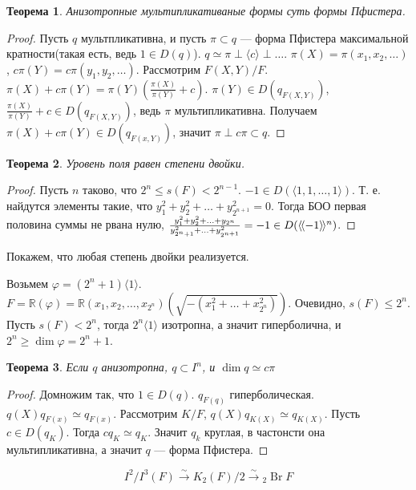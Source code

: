 \documentclass{article}
\newtheorem*{theorem}{Теорема}
\theoremstyle{definition}
\theoremstyle{remark}
\DeclareMathOperator{\Br}{Br}
\newcommand{\llangle}{\langle \hspace{-.5mm} \langle}
\newcommand{\rrangle}{\rangle \hspace{-.5mm} \rangle}
\newcommand{\R}{\mathbb{R}}
\begin{document}
\begin{theorem}
    Анизотропные мультипликативаные формы суть формы Пфистера.
\end{theorem}
\begin{proof}
    Пусть $q$ мультпликативна, и пусть $\pi \subset q$ --- форма Пфистера максимальной кратности(такая есть, ведь $1 \in D(q)$). $q \simeq \pi \perp \langle c \rangle \perp \ldots$. $\pi(X) = \pi(x_1, x_2, \ldots)$, $c\pi(Y) = c\pi(y_1, y_2, \ldots)$. Рассмотрим $F(X, Y) / F$. $\pi(X) + c\pi(Y) = \pi(Y)(\frac{\pi(X)}{\pi(Y)} + c)$. $\pi(Y) \in D(q_{F(X, Y)})$, $\frac{\pi(X)}{\pi(Y)} + c \in D(q_{F(X, Y)})$, ведь $\pi$ мультипликативна. Получаем $\pi(X) + c \pi(Y) \in D(q_{F(x, Y)})$, значит $\pi \perp c\pi \subset q$.
\end{proof}

\begin{theorem}
    Уровень поля равен степени двойки.
\end{theorem}
\begin{proof}
    Пусть $n$ таково, что $2^n \leq s(F) < 2^{n - 1}$. $-1 \in D(\langle 1, 1, \ldots, 1 \rangle)$. Т. е. найдутся элементы такие, что $y_1^2 + y_2^2 + \ldots + y_{2^{n + 1}}^2 = 0$. Тогда БОО первая половина суммы не рвана нулю, $\frac{y_1^2 + y_2^2 + \ldots + y_{2^n}}{y_{2^n + 1}^2 + \ldots + y_{2^{n + 1}}^2} = -1 \in D(\llangle -1 \rrangle^n)$.
\end{proof}

Покажем, что любая степень двойки реализуется.

Возьмем $\varphi = (2^n + 1)\langle 1 \rangle$. $F = \R(\varphi) = \R(x_1, x_2, \ldots, x_{2^n})(\sqrt{-(x_1^2 + \ldots + x_{2^n}^2)})$. Очевидно, $s(F) \leq 2^n$. Пусть $s(F) < 2^n$, тогда $2^n\langle 1 \rangle$ изотропна, а значит гиперболична, и $2^n \geq \dim \varphi = 2^n + 1$.

\begin{theorem}
    Если $q$ анизотропна, $q \subset I^n$, и $\dim q \simeq c\pi$
\end{theorem}
\begin{proof}
    Домножим так, что $1 \in D(q)$. $q_{F(q)}$ гиперболическая. $q(X) q_{F(x)} \simeq q_{F(x)}$. Рассмотрим $K / F$, $q(X)q_{K(X)} \simeq q_{K(X)}$. Пусть $c \in D(q_{K})$. Тогда $cq_K \simeq q_K$. Значит $q_k$ круглая, в частонсти она мультипликативна, а значит $q$ --- форма Пфистера. 
\end{proof}

$$I^2/I^3(F) \xrightarrow{\sim} K_2(F) / 2 \xrightarrow{\sim} {}_2 \Br F$$
\end{document}
